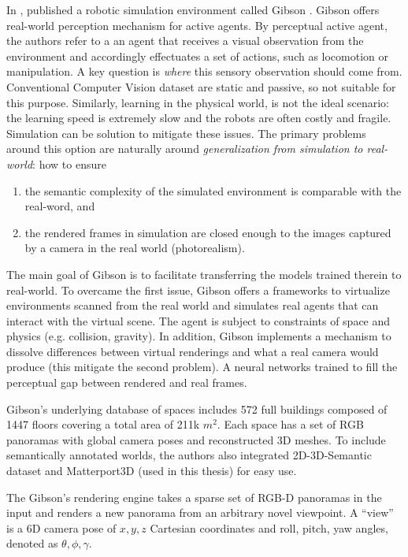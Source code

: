 In \citeyear{gibson}, \citeauthor{gibson} published a robotic simulation environment called Gibson \cite{gibson}. Gibson offers real-world perception mechanism for active agents. By perceptual active agent, the authors refer to a
an agent that receives a visual observation from the environment and accordingly effectuates a set of actions, such as locomotion or manipulation. A key question is \textit{where} this sensory observation should come from. Conventional Computer Vision dataset \cite{coco, imagenet} are static and passive, so not suitable for this purpose.  Similarly, learning in the physical world, is not the ideal scenario: the learning speed is extremely slow and the robots are often costly and fragile. Simulation can be solution to mitigate these issues. 
The primary problems around this option are naturally around \textit{generalization
from simulation to real-world}: how to ensure
\begin{enumerate}
	\item \label{enum:generalizationtorealworld1} the semantic
	complexity of the simulated environment is comparable with the real-word, and
	\item \label{enum:generalizationtorealworld2} the rendered frames in simulation are closed enough to the images captured by a camera in the real world (photorealism).
\end{enumerate} 
The main goal of Gibson is to facilitate transferring the
models trained therein to real-world. To overcame the first issue, Gibson offers a frameworks to virtualize environments scanned from the real world and simulates real agents that can interact with the virtual scene. The agent is subject to constraints of space and physics (e.g. collision, gravity). In addition, Gibson implements a mechanism to dissolve differences between virtual renderings and what a real camera would produce (this mitigate the second problem). A neural networks trained to fill the perceptual gap between rendered and real frames.

Gibson’s underlying database of spaces includes 572 full buildings composed of 1447 floors covering a total area of 211k $m^{2}$. Each space has a set of RGB panoramas with global camera poses and reconstructed 3D meshes. To include semantically annotated worlds, the authors also integrated 2D-3D-Semantic dataset \cite{stanford2d3d} and Matterport3D \cite{matterport} (used in this thesis) for easy use.

The Gibson's rendering engine takes a sparse set of RGB-D panoramas in the input and renders a new panorama from an arbitrary novel viewpoint. A ``view'' is a 6D camera pose of $x, y, z$ Cartesian coordinates and roll, pitch, yaw angles, denoted as $\theta, \phi, \gamma$. 

